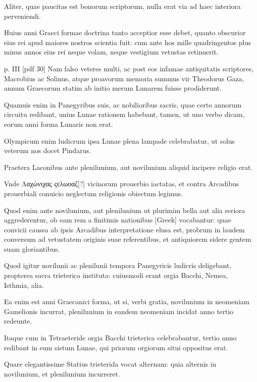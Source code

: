 \begin{parnumbers}
Aliter, quae paucitas est bonorum scriptorum,
nulla erat via ad haec interiora perveniendi.

Huius anni Graeci
formae doctrina tanto acceptior esse debet, quanto obscurior eius
rei apud maiores nostros scientia fuit: cum ante hos mille quadringentos
plus minus annos eius rei neque volam, neque vestigium
vetustas retinuerit.

\clearpage
p. III [pdf 30]
Nam falso veteres multi, ac post eos infamae antiquitatis
scriptores, Macrobius ac Solinus, atque proavorum memoria
summus vir Theodorus Gaza, annum Graecorum statim
ab initio merum Lunarem fuisse prodiderunt.

Quamuis enim in
Panegyribus suis, ac nobilioribus sacris, quae certo annorum circuitu
redibant, unius Lunae rationem habebant, tamen, ut uno verbo
dicam, eorum anni forma Lunaris non erat.

Olympicum enim ludicrum
ipsa Lunae plena lampade celebrabatur, ut solus veterum nos
docet Pindarus. 

Praetera Laconibus ante plenilunium, aut novilunium
aliquid incipere religio erat.

Vnde \textgreek{Λαχώνιχας ςελωοαζ}[?] vicinorum
prouerbio iactatas, et contra Arcadibus prouerbiali conuicio
neglectum religionis obiectum legimus. 

Quod enim ante novilunium,
aut plenilunium ut plurimim bella aut alia seriora aggrederentur,
ob eam rem a finitimis nationibus \textgreek{[Greek]} vocabantur:
quae convicii caussa ab ipsis Arcadibus interpretatione elusa est,
probrum in laudem conversum ad vetustatem originis suae referentibus,
et antiquiorem sidere gentem suam gloriantibus. 

Quod igitur
novilunii ac plenilunii tempora Panegyricis ludicris deligebant,
propterea sacra trieterica instituta: cuiusmodi erant orgia Bacchi,
Nemea, Isthmia, alia.

Ea enim est anni Graecanici forma, ut si, verbi
gratia, novilunium in neomeniam Gamelionis incurrat, plenilunium
in eandem neomeniam incidat anno tertio redeunte.

Itaque
cum in Tetraeteride orgia Bacchi trieterica celebrabantur, tertio
anno redibant in eum sistum Lunae, qui priorum orgiorum situi oppositus
erat.

Quare elegantissime Statius trieterida vocat alternam:
quia alternis in novilunium, et plenilunium incurreret.


\end{parnumbers}
